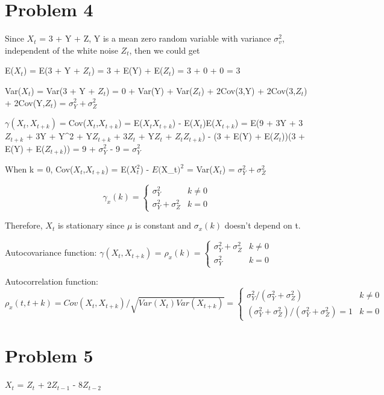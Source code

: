 \documentclass[
]{article}
\begin{document}
\hypertarget{problem-4}{%
\section{Problem 4}\label{problem-4}}

Since \(X_t\) = 3 + Y + Z, Y is a mean zero random variable with
variance \(\sigma_v^2\), independent of the white noise \(Z_t\), then we
could get

E(\(X_t\)) = E(3 + Y + \(Z_t\)) = 3 + E(Y) + E(\(Z_t\)) = 3 + 0 + 0 = 3

Var(\(X_t\)) = Var(3 + Y + \(Z_t\)) = 0 + Var(Y) + Var(\(Z_t\)) +
2Cov(3,Y) + 2Cov(3,\(Z_t\)) + 2Cov(Y,\(Z_t\)) =
\(\sigma_Y^2+\sigma_Z^2\)

\(\gamma(X_t,X_{t+k})=\)Cov(\(X_t\),\(X_{t+k}\)) = E(\(X_tX_{t+k}\)) -
E(\(X_t\))E(\(X_{t+k}\)) = E(9 + 3Y + 3\(Z_{t+k}\) + 3Y + Y\^{}2 +
Y\(Z_{t+k}\) + 3\(Z_t\) + Y\(Z_t\) + \(Z_tZ_{t+k}\)) - (3 + E(Y) +
E(\(Z_t\)))(3 + E(Y) + E(\(Z_{t+k}\))) = 9 + \(\sigma_Y^2\) - 9 =
\(\sigma_Y^2\)

When k = 0, Cov(\(X_t\),\(X_{t+k}\)) = E(\(X_t^2\)) - \(E(\)X\_t\()^2\)
= Var(\(X_t\)) = \(\sigma_Y^2+\sigma_Z^2\)

\[\gamma_x(k) = 
\begin{cases} 
  \sigma_Y^2 & k \ne 0\\ 
  \sigma_Y^2+\sigma_Z^2 & k=0
\end{cases}\]

Therefore, \(X_t\) is stationary since \(\mu\) is constant and
\(\sigma_x(k)\) doesn't depend on t.

Autocovariance function: \(\gamma(X_t,X_{t+k})\) =
\(\rho_x(k) = \begin{cases} \sigma_Y^2+\sigma_Z^2 & k \ne 0\\ \sigma_Y^2 & k=0\end{cases}\)

Autocorrelation function:
\(\rho_x(t,t+k) = Cov(X_t,X_{t+k})/\sqrt{Var(X_t)Var(X_{t+k})} = \begin{cases} \sigma_Y^2/(\sigma_Y^2+\sigma_Z^2) & k \ne 0\\ (\sigma_Y^2+\sigma_Z^2)/(\sigma_Y^2+\sigma_Z^2) = 1 & k=0\end{cases}\)

\hypertarget{problem-5}{%
\section{Problem 5}\label{problem-5}}

\(X_t\) = \(Z_t\) + 2\(Z_{t-1}\) - 8\(Z_{t-2}\)
\end{document}
